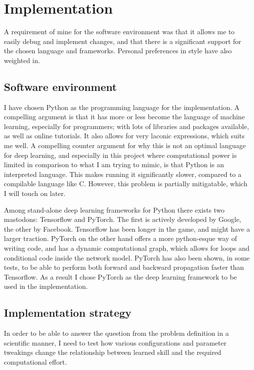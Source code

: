 \chapter{Implementation}
A requirement of mine for the software environment was that it allows me to easily debug and implement changes, and that there is a significant support for the chosen language and frameworks. Personal preferences in style have also weighted in.
 
\section{Software environment}
I have chosen Python as the programming language for the implementation. A compelling argument is that it has more or less become the language of machine learning, especially for programmers; with lots of libraries and packages available, as well as online tutorials. It also allows for very laconic expressions, which suits me well. A compelling counter argument for why this is not an optimal language for deep learning, and especially in this project where computational power is limited in comparison to what I am trying to mimic, is that Python is an interpreted language. This makes running it significantly slower, compared to a compilable language like C. However, this problem is partially mitigatable, which I will touch on later.

Among stand-alone deep learning frameworks for Python there exists two mastodons: Tensorflow and PyTorch. The first is actively developed by Google, the other by Facebook\cite{Hale2019}. Tensorflow has been longer in the game, and might have a larger traction. PyTorch on the other hand offers a more python-esque way of writing code, and has a dynamic computational graph, which allows for loops and conditional code inside the network model. PyTorch has also been shown, in some tests, to be able to perform both forward and backward propagation faster than Tensorflow\cite{John2018}. As a result I chose PyTorch as the deep learning framework to be used in the implementation.

\section{Implementation strategy}
In order to be able to answer the question from the problem definition in a scientific manner, I need to test how various configurations and parameter tweakings change the relationship between learned skill and the required computational effort.

